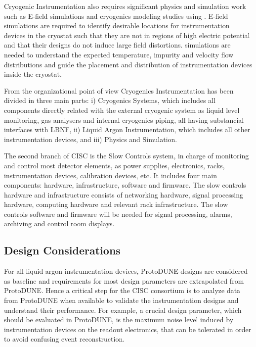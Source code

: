Cryogenic Instrumentation also requires significant physics and
simulation work such as E-field simulations and cryogenics modeling
studies using . E-field simulations
are required to identify desirable locations for instrumentation
devices in the cryostat such that they are not in regions of high electric potential and
that their designs do not induce large field distortions. 
simulations are needed to understand the expected temperature,
impurity and velocity flow distributions and guide the placement and
distribution of instrumentation devices inside the cryostat.


From the organizational point of view
Cryogenics Instrumentation has been divided in three main parts: i) Cryogenics Systems, which includes all components directly related with the external cryogenic system as
liquid level monitoring, gas analysers and internal cryogenics piping, all having substancial interfaces with LBNF, ii) Liquid Argon Instrumentation, which includes all
other instrumentation devices, and iii) Physics and Simulation.


The second branch of CISC is the Slow Controls system, in charge of monitoring and control most detector elements, as power supplies, electronics, racks, instrumentation devices,
calibration devices, etc. It includes four main components: hardware, infrastructure,
software and firmware. The slow controls hardware and infrastructure consists of
networking hardware, signal processing hardware, computing hardware and relevant
rack infrastructure. The slow controls software and firmware will be needed for
signal processing, alarms, archiving and control room displays.



\subsection{Design Considerations}
\label{sec:fdsp-slow-cryo-des-consid}


For all liquid argon instrumentation devices, ProtoDUNE designs are
considered as baseline and requirements for most design
parameters are extrapolated from ProtoDUNE. Hence a critical step for
the CISC consortium is to analyze data from ProtoDUNE when available
to validate the instrumentation designs and understand their
performance. For example, a crucial design parameter, which should be evaluated in ProtoDUNE,
is the maximum noise level induced by instrumentation devices on the readout electronics, that can be tolerated 
in order to avoid confusing event reconstruction. 

